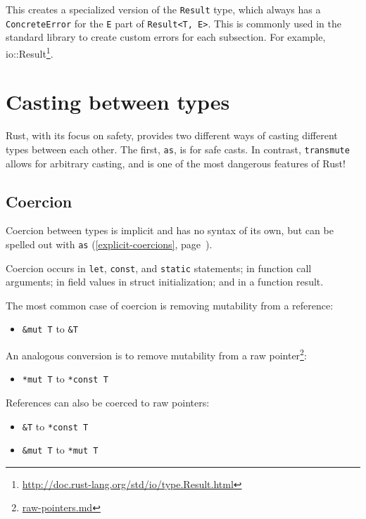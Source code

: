 \documentclass[a4paper,]{book}
\renewcommand*{\hyperlink}[2]{%
 #2 (\autoref{#1}, page~\pageref{#1})}
\renewcommand{\href}[2]{#2\footnote{\url{#1}}}
\providecommand{\tightlist}{%
  \setlength{\itemsep}{0pt}\setlength{\parskip}{0pt}}
\begin{document}
This creates a specialized version of the \texttt{Result} type, which
always has a \texttt{ConcreteError} for the \texttt{E} part of
\texttt{Result\textless{}T,\ E\textgreater{}}. This is commonly used in
the standard library to create custom errors for each subsection. For
example,
\href{http://doc.rust-lang.org/std/io/type.Result.html}{io::Result}.

\section{Casting between types}\label{sec--casting-between-types}

Rust, with its focus on safety, provides two different ways of casting
different types between each other. The first, \texttt{as}, is for safe
casts. In contrast, \texttt{transmute} allows for arbitrary casting, and
is one of the most dangerous features of Rust!

\subsection{Coercion}\label{coercion}

Coercion between types is implicit and has no syntax of its own, but can
be spelled out with \protect\hyperlink{explicit-coercions}{\texttt{as}}.

Coercion occurs in \texttt{let}, \texttt{const}, and \texttt{static}
statements; in function call arguments; in field values in struct
initialization; and in a function result.

The most common case of coercion is removing mutability from a
reference:

\begin{itemize}
\tightlist
\item
  \texttt{\&mut\ T} to \texttt{\&T}
\end{itemize}

An analogous conversion is to remove mutability from a
\href{raw-pointers.md}{raw pointer}:

\begin{itemize}
\tightlist
\item
  \texttt{*mut\ T} to \texttt{*const\ T}
\end{itemize}

References can also be coerced to raw pointers:

\begin{itemize}
\item
  \texttt{\&T} to \texttt{*const\ T}
\item
  \texttt{\&mut\ T} to \texttt{*mut\ T}
\end{itemize}
\end{document}
